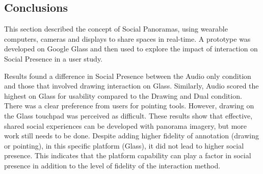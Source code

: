 
\subsection{Conclusions}

This section described the concept of Social Panoramas, using wearable computers, cameras and displays to share spaces in real-time. A prototype was developed on Google Glass and then used to explore the impact of interaction on Social Presence in a user study. 

Results found a difference in Social Presence between the Audio only condition and those that involved drawing interaction on Glass. Similarly, Audio scored the highest on Glass for usability compared to the Drawing and Dual condition. There was a clear preference from users for pointing tools. However, drawing on the Glass touchpad was perceived as difficult. These results show that effective, shared social experiences can be developed with panorama imagery, but more work still needs to be done.
Despite adding higher fidelity of annotation (drawing or pointing), in this specific platform (Glass), it did not lead to higher social presence. This indicates that the platform capability can play a factor in social presence in addition to the level of fidelity of the interaction method.




